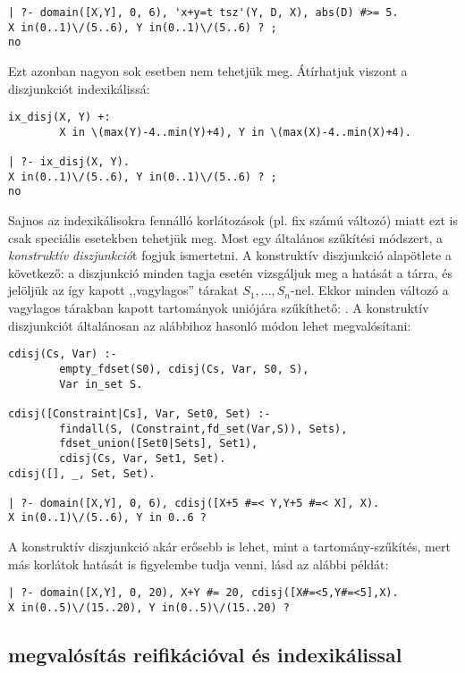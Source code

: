 \begin{verbatim}
| ?- domain([X,Y], 0, 6), 'x+y=t tsz'(Y, D, X), abs(D) #>= 5.
X in(0..1)\/(5..6), Y in(0..1)\/(5..6) ? ;
no
\end{verbatim}

Ezt azonban nagyon sok esetben nem tehetjük meg. Átírhatjuk viszont a diszjunkciót
indexikálissá:

\begin{verbatim}
ix_disj(X, Y) +:
        X in \(max(Y)-4..min(Y)+4), Y in \(max(X)-4..min(X)+4).

| ?- ix_disj(X, Y).
X in(0..1)\/(5..6), Y in(0..1)\/(5..6) ? ;
no
\end{verbatim}

Sajnos az indexikálisokra fennálló korlátozások (pl. fix számú változó) miatt ezt
is csak speciális esetekben tehetjük meg. Most egy általános szűkítési módszert,
a \emph{konstruktív diszjunkció}t fogjuk ismertetni.
\br
A konstruktív diszjunkció alapötlete a következő: a diszjunkció minden tagja esetén
vizsgáljuk meg a hatását a tárra, és jelöljük az így kapott ,,vagylagos'' tárakat
$S_1, \ldots, S_n$-nel. Ekkor minden változó a vagylagos tárakban kapott tartományok
uniójára szűkíthető: . A konstruktív diszjunkciót
általánosan az alábbihoz hasonló módon lehet megvalósítani:

\begin{verbatim}
cdisj(Cs, Var) :-
        empty_fdset(S0), cdisj(Cs, Var, S0, S),
        Var in_set S.

cdisj([Constraint|Cs], Var, Set0, Set) :-
        findall(S, (Constraint,fd_set(Var,S)), Sets),
        fdset_union([Set0|Sets], Set1),
        cdisj(Cs, Var, Set1, Set).
cdisj([], _, Set, Set).

| ?- domain([X,Y], 0, 6), cdisj([X+5 #=< Y,Y+5 #=< X], X).
X in(0..1)\/(5..6), Y in 0..6 ?
\end{verbatim}

A konstruktív diszjunkció akár erősebb is lehet, mint a tartomány-szűkítés, mert más
korlátok hatását is figyelembe tudja venni, lásd az alábbi példát:

\begin{verbatim}
| ?- domain([X,Y], 0, 20), X+Y #= 20, cdisj([X#=<5,Y#=<5],X).
X in(0..5)\/(15..20), Y in(0..5)\/(15..20) ?
\end{verbatim}

\subsection{\clpfd megvalósítás reifikációval és indexikálissal}

